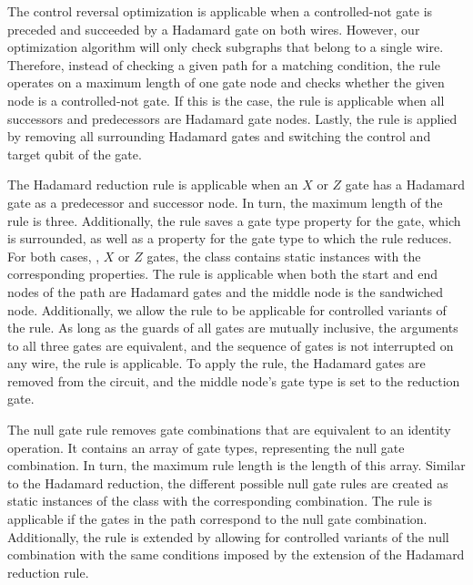 The control reversal optimization is applicable when a controlled-not gate is preceded and succeeded by a Hadamard gate on both wires. However, our optimization algorithm will only check subgraphs that belong to a single wire. Therefore, instead of checking a given path for a matching condition, the rule operates on a maximum length of one gate node and checks whether the given node is a controlled-not gate. If this is the case, the rule is applicable when all successors and predecessors are Hadamard gate nodes. Lastly, the rule is applied by removing all surrounding Hadamard gates and switching the control and target qubit of the gate.

The Hadamard reduction rule is applicable when an $X$ or $Z$ gate has a Hadamard gate as a predecessor and successor node. In turn, the maximum length of the rule is three. Additionally, the rule saves a gate type property for the gate, which is surrounded, as well as a property for the gate type to which the rule reduces. For both cases, \ie, $X$ or $Z$ gates, the class contains static instances with the corresponding properties. The rule is applicable when both the start and end nodes of the path are Hadamard gates and the middle node is the sandwiched node. Additionally, we allow the rule to be applicable for controlled variants of the rule. As long as the guards of all gates are mutually inclusive, the arguments to all three gates are equivalent, and the sequence of gates is not interrupted on any wire, the rule is applicable. To apply the rule, the Hadamard gates are removed from the circuit, and the middle node's gate type is set to the reduction gate.

The null gate rule removes gate combinations that are equivalent to an identity operation. It contains an array of gate types, representing the null gate combination. In turn, the maximum rule length is the length of this array. Similar to the Hadamard reduction, the different possible null gate rules are created as static instances of the class with the corresponding combination. The rule is applicable if the gates in the path correspond to the null gate combination. Additionally, the rule is extended by allowing for controlled variants of the null combination with the same conditions imposed by the extension of the Hadamard reduction rule.

